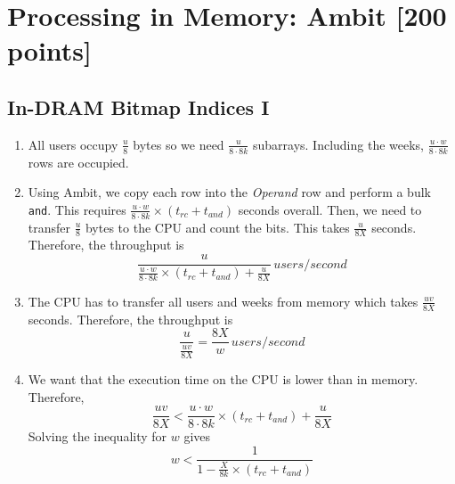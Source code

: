 \documentclass[a4paper]{article}
\begin{document}
\section{Processing in Memory: Ambit [200 points]}

\subsection{In-DRAM Bitmap Indices I}

\begin{enumerate}[label=\alph*)]
    \item All users occupy $\frac{u}{8}$ bytes so we need $\frac{u}{8\cdot8k}$ subarrays. Including the
        weeks, $\frac{u \cdot w}{8\cdot8k}$ rows are occupied.
    \item Using Ambit, we copy each row into the \textit{Operand} row and perform a bulk \verb|and|. This 
        requires $\frac{u \cdot w}{8\cdot8k} \times (t_{rc} + t_{and})$ seconds overall. Then, we need 
        to transfer $\frac{u}{8}$ bytes to the CPU and count the bits. This takes $\frac{u}{8X}$ seconds.
        Therefore, the throughput is
        \begin{equation*}
            \frac{u}{
                \frac{u \cdot w}{8\cdot8k} \times (t_{rc} + t_{and}) +
                \frac{u}{8X}
            } \, users/second
        \end{equation*}

    \item The CPU has to transfer all users and weeks from memory which takes $\frac{uv}{8X}$
        seconds. Therefore, the throughput is
        \begin{equation*}
            \frac{u}{\frac{uv}{8X}} = \frac{8X}{w} \, users/second
        \end{equation*}

    \item We want that the execution time on the CPU is lower than in memory. Therefore,
        \begin{equation*}
        \frac{uv}{8X} < \frac{u \cdot w}{8\cdot8k} \times (t_{rc} + t_{and}) +
                \frac{u}{8X}
        \end{equation*}
        Solving the inequality for $w$ gives
        \begin{equation*}
            w < \frac{1}{1 - \frac{X}{8k} \times (t_{rc} + t_{and})}
        \end{equation*}
\end{enumerate}
\end{document}
